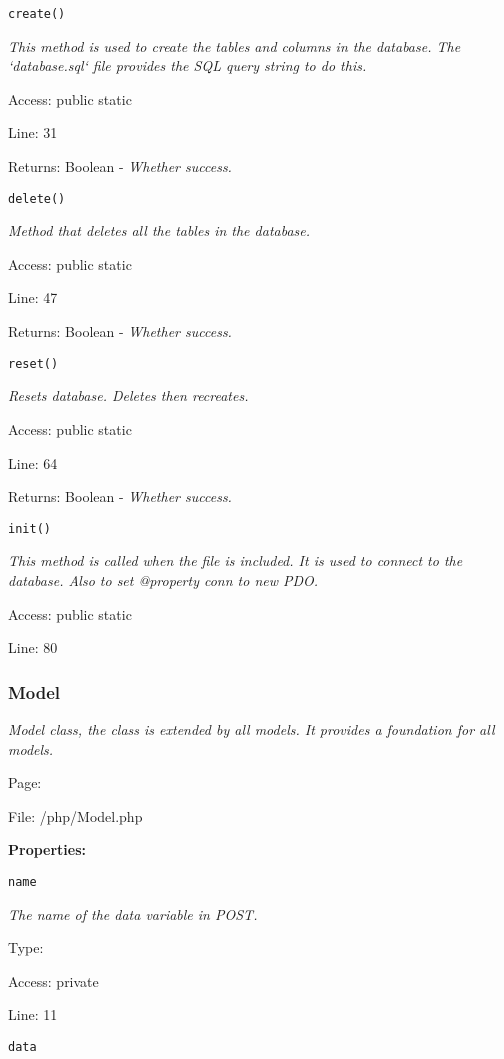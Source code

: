 \texttt{create()}

{\scriptsize
\textit{This method is used to create the tables and columns in the database.
The `database.sql` file provides the SQL query string to do this.}

Access: public static

Line: 31

Returns: Boolean - \textit{Whether success.}

}

\texttt{delete()}

{\scriptsize
\textit{Method that deletes all the tables in the database.}

Access: public static

Line: 47

Returns: Boolean - \textit{Whether success.}

}

\texttt{reset()}

{\scriptsize
\textit{Resets database.
Deletes then recreates.}

Access: public static

Line: 64

Returns: Boolean - \textit{Whether success.}

}

\texttt{init()}

{\scriptsize
\textit{This method is called when the file is included.
It is used to connect to the database.
Also to set @property conn to new PDO.}

Access: public static

Line: 80

}

\subsubsection{Model}\label{Model.php.doc}
\textit{Model class, the class is extended by all models.
It provides a foundation for all models.}

Page: \pageref{Model.php}

File: /php/Model.php

\textbf{Properties:}

\texttt{name}

{\scriptsize
\textit{The name of the data variable in POST.}

Type: 

Access: private

Line: 11

}
\texttt{data}

